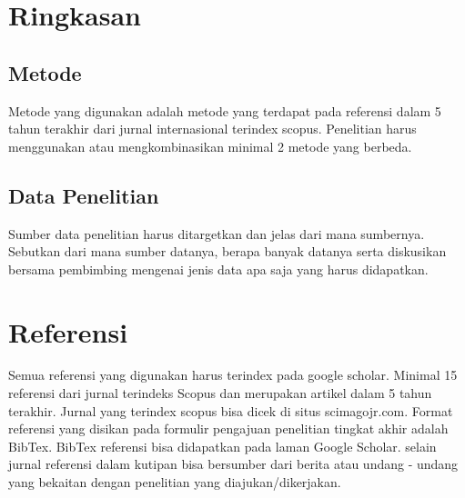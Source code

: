 \section{Ringkasan}
\subsection{Metode}
Metode yang digunakan adalah metode yang terdapat pada referensi dalam 5 tahun terakhir dari jurnal internasional terindex scopus. Penelitian harus menggunakan atau mengkombinasikan minimal 2 metode yang berbeda.

\subsection{Data Penelitian}
Sumber data penelitian harus ditargetkan dan jelas dari mana sumbernya. Sebutkan dari mana sumber datanya, berapa banyak datanya serta diskusikan bersama pembimbing mengenai jenis data apa saja yang harus didapatkan. 

\section{Referensi}
Semua referensi yang digunakan harus terindex pada google scholar. Minimal 15 referensi dari jurnal terindeks Scopus dan merupakan artikel dalam 5 tahun terakhir. Jurnal yang terindex scopus bisa dicek di situs scimagojr.com. Format referensi yang disikan pada formulir pengajuan penelitian tingkat akhir adalah BibTex. BibTex referensi bisa didapatkan pada laman Google Scholar. selain jurnal referensi dalam kutipan bisa bersumber dari berita atau undang - undang yang bekaitan dengan penelitian yang diajukan/dikerjakan.




